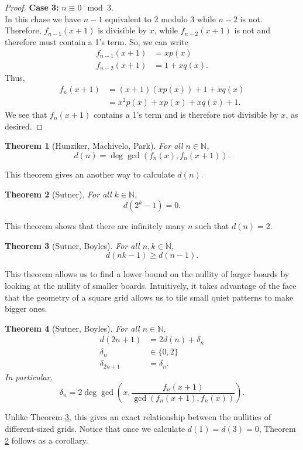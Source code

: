 \documentclass[a4paper]{article}
\newtheorem{theorem}{Theorem}
\newcommand{\N}{\mathbb{N}}
\begin{document}
\begin{proof}
		\textbf{Case 3: } $n \equiv 0 \mod 3$. \\
		In this chase we have $n-1$ equivalent to 2 modulo 3 while $n-2$ is not.
		Therefore, $f_{n-1}(x+1)$ is divisible by $x$, while $f_{n-2}(x+1)$ is not and therefore must contain a 1's term.
		So, we can write
		\begin{align*}
			f_{n-1}(x+1) &= x p(x) \\
			f_{n-2}(x+1) &= 1 + x q(x).
		\end{align*}
		Thus,
		\begin{align*}
			f_n(x+1) &= (x+1)(xp(x)) + 1 + xq(x) \\
			&= x^2 p(x) + xp(x) + xq(x) + 1.
		\end{align*}
		We see that $f_n(x+1)$ contains a 1's term and is therefore not divisible by $x$, as desired.
	\end{proof}
	
	\begin{theorem}[Hunziker, Machivelo, Park]\label{thm-polygcd}
		For all $n \in \N$,
		\begin{equation*}
			d(n) = \deg{\gcd{\left(f_n(x), f_n(x+1)\right)}}.
		\end{equation*}
	\end{theorem}
	This theorem gives an another way to calculate $d(n)$.
	
	\begin{theorem}[Sutner]\label{thm-pow(2,k)-1}
		For all $k \in \N$,
		\begin{equation*}
			d(2^k - 1) = 0.
		\end{equation*}
	\end{theorem}
	This theorem shows that there are infinitely many $n$ such that $d(n) = 2$.
	
	\begin{theorem}[Sutner, Boyles]\label{thm-tiling}
		For all $n, k \in \N$,
		\begin{equation*}
			d(nk - 1) \geq d(n-1).
		\end{equation*}
	\end{theorem}
	This theorem allows us to find a lower bound on the nullity of larger boards by looking at the nullity of smaller boards.
	Intuitively, it takes advantage of the face that the geometry of a square grid allows us to tile small quiet patterns to make bigger ones.
	
	\begin{theorem}[Sutner, Boyles]
		For all $n \in \N$,
		\begin{align*}
			d(2n+1) &= 2d(n) + \delta_n \\
			\delta_n &\in \{0,2\} \\
			\delta_{2n+1} &= \delta_{n}.
		\end{align*}
		In particular,
		\begin{equation*}
			\delta_n = 2 \deg{\gcd{\left(x, \frac{f_n(x+1)}{\gcd{(f_n(x+1), f_n(x))}}\right)}}.
		\end{equation*}
	\end{theorem}
	Unlike Theorem \ref{thm-tiling}, this gives an exact relationship between the nullities of different-sized grids.
	Notice that once we calculate $d(1) = d(3) = 0$, Theorem \ref{thm-pow(2,k)-1} follows as a corollary.
	
\end{document}
